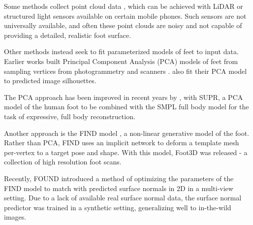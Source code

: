 Some methods collect point cloud data \cite{lunscher2017point, xesto}, which can be achieved with LiDAR or structured light sensors available on certain mobile phones. Such sensors are not universally available, and often these point clouds are noisy and not capable of providing a detailed, realistic foot surface.

Other methods instead seek to fit parameterized models of feet to input data. Earlier works built Principal Component Analysis (PCA) models of feet from sampling vertices from photogrammetry \cite{kok2020footnet} and scanners \cite{amstutz2008pca}. \citet{kok2020footnet} also fit their PCA model to predicted image silhouettes.

The PCA approach has been improved in recent years by \citet{osman2022supr}, with SUPR, a PCA model of the human foot to be combined with the SMPL \cite{SMPL:2015} full body model for the task of expressive, full body reconstruction. 

Another approach is the FIND model \cite{boyne2022find}, a non-linear generative model of the foot. Rather than PCA, FIND uses an implicit network to deform a template mesh per-vertex to a target pose and shape. With this model, Foot3D was released - a collection of high resolution foot scans.

Recently, FOUND \cite{boyne2024found} introduced a method of optimizing the parameters of the FIND model to match with predicted surface normals in 2D in a multi-view setting. Due to a lack of available real surface normal data, the surface normal predictor was trained in a synthetic setting, generalizing well to in-the-wild images.